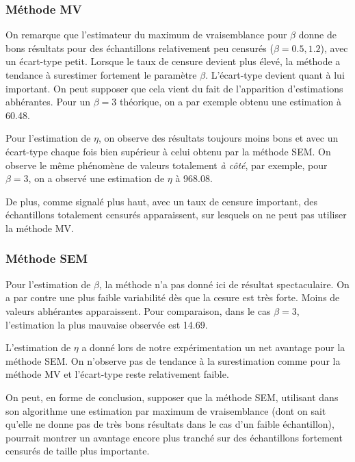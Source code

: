 \documentclass[a4paper]{report}
\begin{document}
\subsubsection*{Méthode MV}

On remarque que l'estimateur du maximum de vraisemblance pour $\beta$ donne de bons résultats pour des échantillons relativement peu censurés ($\beta=0.5,1.2$), avec un écart-type petit. Lorsque le taux de censure devient plus élevé, la méthode a tendance à surestimer fortement le paramètre $\beta$. L'écart-type devient quant à lui important. On peut supposer que cela vient du fait de l'apparition d'estimations abhérantes. Pour un  $\beta=3$ théorique, on a par exemple obtenu une estimation à 60.48. 

Pour l'estimation de $\eta$, on observe des résultats toujours moins bons et avec un écart-type chaque fois bien supérieur à celui obtenu par la méthode SEM. On observe le même phénomène de valeurs totalement \emph{à côté}, par exemple, pour $\beta=3$, on a observé une estimation de $\eta$ à 968.08.

De plus, comme signalé plus haut, avec un taux de censure important, des échantillons totalement censurés apparaissent, sur lesquels on ne peut pas utiliser la méthode MV.

\subsubsection*{Méthode SEM}

Pour l'estimation de $\beta$, la méthode n'a pas donné ici de résultat spectaculaire. On a par contre une plus faible variabilité dès que la cesure est très forte. Moins de valeurs abhérantes apparaissent. Pour comparaison, dans le cas $\beta=3$, l'estimation la plus mauvaise observée est 14.69.  

L'estimation de $\eta$ a donné lors de notre expérimentation un net avantage pour la méthode SEM. On n'observe pas de tendance à la surestimation comme pour la méthode MV et l'écart-type reste relativement faible. 

On peut, en forme de conclusion, supposer que la méthode SEM, utilisant dans son algorithme une estimation par maximum de vraisemblance (dont on sait qu'elle ne donne pas de très bons résultats dans le cas d'un faible échantillon), pourrait montrer un avantage encore plus tranché sur des échantillons fortement censurés de taille plus importante. 
\end{document}
